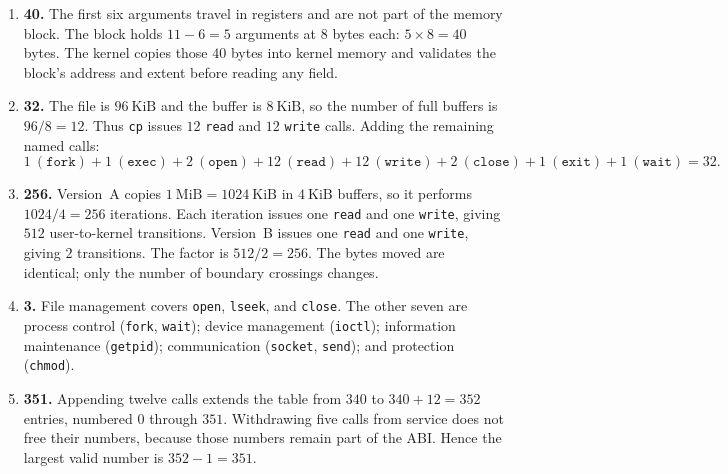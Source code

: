 \documentclass[11pt]{article}
\begin{document}
\begin{enumerate}
\item[\textbf{Q6}] \textbf{40.} The first six arguments travel in registers and are not part of the memory block. The block holds $11 - 6 = 5$ arguments at $8$ bytes each: $5 \times 8 = 40$ bytes. The kernel copies those $40$ bytes into kernel memory and validates the block's address and extent before reading any field.

\item[\textbf{Q7}] \textbf{32.} The file is $96\ \text{KiB}$ and the buffer is $8\ \text{KiB}$, so the number of full buffers is $96/8 = 12$. Thus \texttt{cp} issues $12$ \texttt{read} and $12$ \texttt{write} calls. Adding the remaining named calls:
\[
1\ (\texttt{fork}) + 1\ (\texttt{exec}) + 2\ (\texttt{open}) + 12\ (\texttt{read}) + 12\ (\texttt{write}) + 2\ (\texttt{close}) + 1\ (\texttt{exit}) + 1\ (\texttt{wait}) = 32.
\]

\item[\textbf{Q8}] \textbf{256.} Version~A copies $1\ \text{MiB} = 1024\ \text{KiB}$ in $4\ \text{KiB}$ buffers, so it performs $1024/4 = 256$ iterations. Each iteration issues one \texttt{read} and one \texttt{write}, giving $512$ user-to-kernel transitions. Version~B issues one \texttt{read} and one \texttt{write}, giving $2$ transitions. The factor is $512/2 = 256$. The bytes moved are identical; only the number of boundary crossings changes.

\item[\textbf{Q9}] \textbf{3.} File management covers \texttt{open}, \texttt{lseek}, and \texttt{close}. The other seven are process control (\texttt{fork}, \texttt{wait}); device management (\texttt{ioctl}); information maintenance (\texttt{getpid}); communication (\texttt{socket}, \texttt{send}); and protection (\texttt{chmod}).

\item[\textbf{Q10}] \textbf{351.} Appending twelve calls extends the table from $340$ to $340 + 12 = 352$ entries, numbered $0$ through $351$. Withdrawing five calls from service does not free their numbers, because those numbers remain part of the ABI. Hence the largest valid number is $352 - 1 = 351$.

\end{enumerate}
\end{document}
